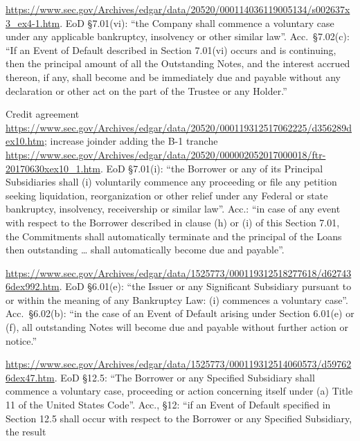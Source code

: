 \documentclass[11pt]{article}
\begin{document}
{\footnotesize
\begin{description}[leftmargin=0pt,itemsep=3pt]
\item[Frontier 8.000\% first-lien notes due 2027.] \url{https://www.sec.gov/Archives/edgar/data/20520/000114036119005134/s002637x3_ex4-1.htm}.
EoD \S7.01(vi): ``the Company shall commence a voluntary case under any applicable bankruptcy, insolvency or
other similar law''. Acc.\ \S7.02(c): ``If an Event of Default described in Section 7.01(vi) occurs and is
continuing, then the principal amount of all the Outstanding Notes, and the interest accrued thereon, if any,
shall become and be immediately due and payable without any declaration or other act on the part of the
Trustee or any Holder.''
\item[Frontier term B-1 loans.] Credit agreement \url{https://www.sec.gov/Archives/edgar/data/20520/000119312517062225/d356289dex10.htm};
increase joinder adding the B-1 tranche \url{https://www.sec.gov/Archives/edgar/data/20520/000002052017000018/ftr-20170630xex10_1.htm}.
EoD \S7.01(i): ``the Borrower or any of its Principal Subsidiaries shall (i) voluntarily commence any proceeding
or file any petition seeking liquidation, reorganization or other relief under any Federal or state
bankruptcy, insolvency, receivership or similar law''. Acc.: ``in case of any event with respect to the
Borrower described in clause (h) or (i) of this Section 7.01, the Commitments shall automatically terminate and
the principal of the Loans then outstanding \ldots{} shall automatically become due and payable''.
\item[Intelsat Jackson 8.50\% notes due 2024.] \url{https://www.sec.gov/Archives/edgar/data/1525773/000119312518277618/d627436dex992.htm}.
EoD \S6.01(e): ``the Issuer or any Significant Subsidiary pursuant to or within the meaning of any Bankruptcy
Law: (i) commences a voluntary case''. Acc.\ \S6.02(b): ``in the case of an Event of Default arising under
Section 6.01(e) or (f), all outstanding Notes will become due and payable without further action or notice.''
\item[Intelsat Jackson term loans (2011 agreement, 2013 conformed text).] \url{https://www.sec.gov/Archives/edgar/data/1525773/000119312514060573/d597626dex47.htm}.
EoD \S12.5: ``The Borrower or any Specified Subsidiary shall commence a voluntary case, proceeding or action
concerning itself under (a) Title 11 of the United States Code''. Acc., \S12: ``if an Event of Default
specified in Section 12.5 shall occur with respect to the Borrower or any Specified Subsidiary, the result

\end{description}}
\end{document}
